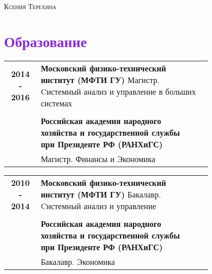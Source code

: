 \documentclass[a4paper, oneside, final]{scrartcl} %
\begin{document}
\begin{center} %


{\fontsize{24}{24}\selectfont\scshape Ксения Терехина} %




\section{\textbf{\textcolor{BlueViolet}{Образование}}}

\begin{tabularx}{0.99\linewidth}{cp{0.8\linewidth}l}
 \textbf{2014 - 2016} & \textbf{Московский физико-технический институт (МФТИ ГУ)} {Магистр. Cистемный анализ и управление в больших системах} \\
 & \quad \\
 & \textbf{Российская академия народного хозяйства и государственной службы при Президенте РФ (РАНХиГС) } \\ 
 & Магистр. Финансы и Экономика \\
 
\end{tabularx}

\vspace{10pt}
\begin{tabularx}{0.99\linewidth}{cp{0.8\linewidth}l}
 \textbf{2010 - 2014} & \textbf{Московский физико-технический институт (МФТИ ГУ)} {Бакалавр. Cистемный анализ и управление } \\
  & \quad \\
  & \textbf{Российская академия народного хозяйства и государственной службы при Президенте РФ (РАНХиГС) } \\
  & {Бакалавр. Экономика}\\
 
\end{tabularx}



\end{center}
\end{document}
